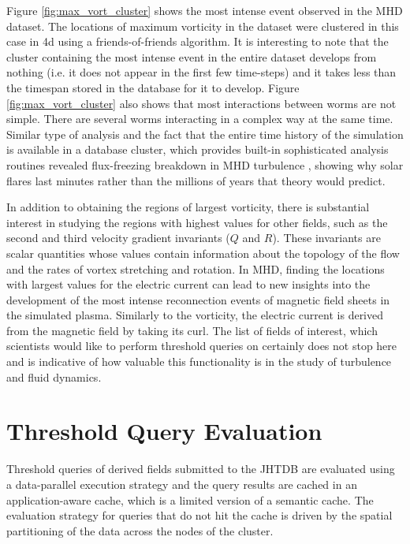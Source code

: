 \documentclass{sig-alternate}
\begin{document}
Figure \ref{fig:max_vort_cluster} shows the most intense event observed in the MHD dataset. The locations of maximum vorticity in the dataset were clustered
in this case in 4d using a friends-of-friends algorithm. It is interesting to note that the cluster containing the most intense event in the entire dataset develops
from nothing (i.e. it does not appear in the first few time-steps) and it takes less than the timespan stored in the database for it to develop. 
Figure \ref{fig:max_vort_cluster} also shows that most interactions between worms are not simple. 
There are several worms interacting in a complex way at the same time. Similar type of analysis and the fact that the entire time history of the simulation
is available in a database cluster, which provides built-in sophisticated analysis routines revealed flux-freezing breakdown in MHD turbulence \cite{Eyink},
showing why solar flares last minutes rather than the millions of years that theory would predict.

In addition to obtaining the regions of largest vorticity, there is substantial interest in studying the regions with highest values for other fields, such as
the second and third velocity gradient invariants ($Q$ and $R$). These invariants are scalar quantities whose values contain information about the 
topology of the flow and the rates of vortex stretching and rotation. In MHD, finding the locations with largest values for the electric current
can lead to new insights into the development of the most intense reconnection events of magnetic field sheets in the simulated plasma. Similarly to
the vorticity, the electric current is derived from the magnetic field by taking its curl. The list of fields of interest, which scientists would like to perform 
threshold queries on certainly does not stop here and is indicative of how valuable this functionality is in the study of turbulence and fluid dynamics.

\section{Threshold Query Evaluation}

Threshold queries of derived fields submitted to the JHTDB are evaluated using a data-parallel execution strategy and the query results are 
cached in an application-aware cache, which is a limited version of a semantic cache. 
The evaluation strategy for queries that do not hit the cache is driven by the spatial partitioning of the data across the nodes of the cluster.
\end{document}
